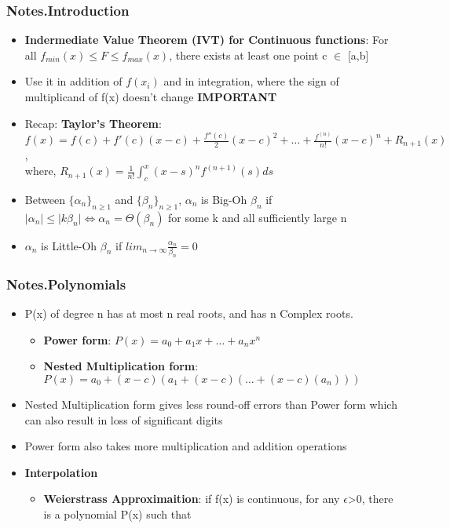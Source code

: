 \documentclass[12pt,letterpaper]{article}
\newcommand\asgnname{Notes}         %
\newenvironment{answer}[1]{
  \subsubsection*{%
  \asgnname.#1}
}{\newpage}
\begin{document}
\begin{answer}{Introduction}
\begin{itemize}
\begin{itemize}
        \end{itemize}
        \item \textbf{Indermediate Value Theorem (IVT) for Continuous functions}: For all $f_{min}(x) \le F \le f_{max}(x)$, there exists at least one point c $\in$ [a,b]
        \item Use it in addition of $f(x_i)$ and in integration, where the sign of multiplicand of f(x) doesn't change \textbf{IMPORTANT}
        \item Recap: \textbf{Taylor's Theorem}: \\
        $f(x) = f(c)+f'(c)(x-c)+\frac{f''(c)}{2}(x-c)^2 + \ldots + \frac{f^{(n)}}{n!}(x-c)^n + R_{n+1}(x)$,\\
        where, $R_{n+1}(x)=\frac{1}{n!}\int _c^x (x-s)^n f^{(n+1)}(s) ds$
        \item Between $\{\alpha _n\}_{n \ge 1}$ and $\{\beta _n\}_{n \ge 1}$, $\alpha _n$ is Big-Oh $\beta _n$ if $\mid \alpha _n \mid \le \mid k\beta _n \mid \iff \alpha _n = \Theta(\beta _n)$ for some k and all sufficiently large n
        \item $\alpha _n$ is Little-Oh $\beta _n$ if $lim_{n\to \infty} \frac{\alpha _n}{\beta _n} = 0$
        
    \end{itemize}
\end{answer}

\begin{answer}{Polynomials}
\begin{itemize}
    \item P(x) of degree n has at most n real roots, and has n Complex roots.
    \begin{itemize}
        \item \textbf{Power form}: $P(x) = a_0 + a_1x + \ldots + a_nx^n$
        \item \textbf {Nested Multiplication form}: $P(x) = a_0 + (x-c)(a_1+ (x-c)(\ldots+(x-c)(a_n)))$
    \end{itemize}
    \item Nested Multiplication form gives less round-off errors than Power form which can also result in loss of significant digits
    \item Power form also takes more multiplication and addition operations
    \item \textbf {Interpolation}
    \begin{itemize}
        \item \textbf{Weierstrass Approximaition}: if f(x) is continuous, for any $\epsilon$>0, there is a polynomial P(x) such that 
    \end{itemize}
\end{itemize}
\end{answer}
\end{document}
